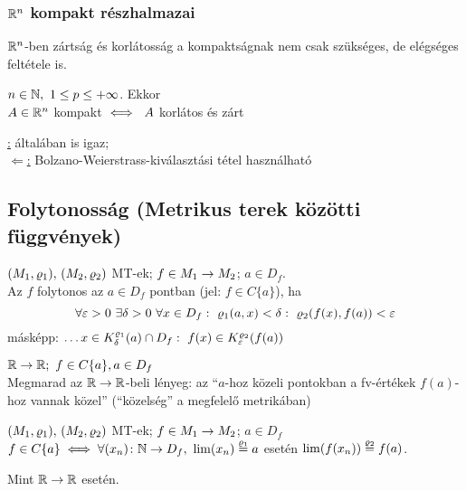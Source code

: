 \subsubsection{$\mathbb{R}^n$ kompakt részhalmazai}
$\mathbb{R}^n$-ben zártság és korlátosság a kompaktságnak nem csak
szükséges, de elégséges feltétele is.

\begin{te}
  $n\in\mathbb{N},\ 1\leq p\leq +\infty$. Ekkor\\
  $A\in\mathbb{R}^n$ kompakt $\iff\ A$ korlátos és zárt
\end{te}

\begin{biz}
  \underline{\nn:} általában is igaz;\\
  \underline{$\Leftarrow$:} Bolzano-Weierstrass-kiválasztási tétel
  használható
\end{biz}

\subsection{Folytonosság (Metrikus terek közötti függvények)}
\begin{de}
  $(M_1,\varrho_1),\,(M_2,\varrho_2)$ MT-ek; $f\in M_1\to M_2$; $a\in D_f$.\\
  Az $f$ folytonos az $a\in D_f$ pontban (jel: $f\in C\{a\}$), ha
  \[\forall \epsilon>0\ \exists\delta>0\ \forall x\in D_f:\
  \ro_1(a,x)<\delta:\ \ro_2(f(x),f(a))<\epsilon\]
  másképp: $\ldots x\in K_\delta^{\ro_1}(a)\cap D_f:\ f(x)\in
  K_\epsilon^{\ro_2}(f(a))$
\end{de}

\begin{megj} $\mathbb{R}\to\mathbb{R};\ f\in C\{a\}, a\in D_f$\\
  Megmarad az $\mathbb{R}\to\mathbb{R}$-beli lényeg: az ``$a$-hoz közeli pontokban a
  fv-értékek $f(a)$-hoz vannak közel'' (``közelség'' a megfelelő
  metrikában)
\end{megj}

\begin{te}
  $(M_1,\varrho_1),\,(M_2,\varrho_2)$ MT-ek; $f\in M_1\to M_2$; 
  $a\in D_f$\\
  $f\in C\{a\} \iff \forall (x_n)\colon  \mathbb{N}\to D_f,\ \lim(x_n)
  \stackrel{\varrho_{1}}{=} a$ esetén $\lim( f(x_n))\stackrel{\varrho_{2}}{=} f(a)$.\\
  
\end{te}
\begin{biz} Mint $\mathbb{R}\to\mathbb{R}$ esetén.
\end{biz}

